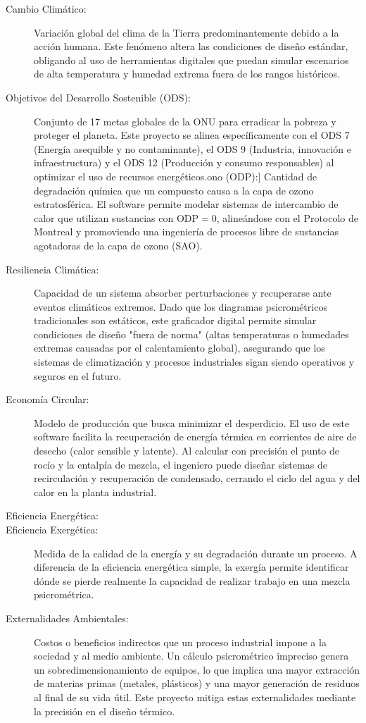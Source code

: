 \begin{description}
        \item[Cambio Climático:] Variación global del clima de la Tierra predominantemente debido a la acción humana. Este fenómeno altera las condiciones de diseño estándar, obligando al uso de herramientas digitales que puedan simular escenarios de alta temperatura y humedad extrema fuera de los rangos históricos.
        \item[Objetivos del Desarrollo Sostenible (ODS):] Conjunto de 17 metas globales de la ONU para erradicar la pobreza y proteger el planeta. Este proyecto se alinea específicamente con el ODS 7 (Energía asequible y no contaminante), el ODS 9 (Industria, innovación e infraestructura) y el ODS 12 (Producción y consumo responsables) al optimizar el uso de recursos energéticos.ono (ODP):] Cantidad de degradación química que un compuesto causa a la capa de ozono estratosférica. El software permite modelar sistemas de intercambio de calor que utilizan sustancias con $\text{ODP} = 0$, alineándose con el Protocolo de Montreal y promoviendo una ingeniería de procesos libre de sustancias agotadoras de la capa de ozono (SAO).
        \item[Resiliencia Climática:] Capacidad de un sistema absorber perturbaciones y recuperarse ante eventos climáticos extremos. Dado que los diagramas psicrométricos tradicionales son estáticos, este graficador digital permite simular condiciones de diseño "fuera de norma" (altas temperaturas o humedades extremas causadas por el calentamiento global), asegurando que los sistemas de climatización y procesos industriales sigan siendo operativos y seguros en el futuro.
        \item[Economía Circular:] Modelo de producción que busca minimizar el desperdicio. El uso de este software facilita la recuperación de energía térmica en corrientes de aire de desecho (calor sensible y latente). Al calcular con precisión el punto de rocío y la entalpía de mezcla, el ingeniero puede diseñar sistemas de recirculación y recuperación de condensado, cerrando el ciclo del agua y del calor en la planta industrial.
        \item[Eficiencia Energética:]   
        \item[Eficiencia Exergética:] Medida de la calidad de la energía y su degradación durante un proceso. A diferencia de la eficiencia energética simple, la exergía permite identificar dónde se pierde realmente la capacidad de realizar trabajo en una mezcla psicrométrica. %

        \item[Externalidades Ambientales:] Costos o beneficios indirectos que un proceso industrial impone a la sociedad y al medio ambiente. Un cálculo psicrométrico impreciso genera un sobredimensionamiento de equipos, lo que implica una mayor extracción de materias primas (metales, plásticos) y una mayor generación de residuos al final de su vida útil. Este proyecto mitiga estas externalidades mediante la precisión en el diseño térmico.
    \end{description}

